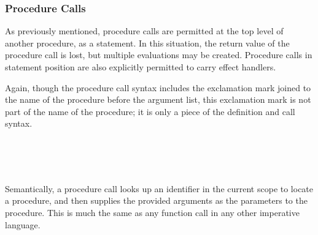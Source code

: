 \subsubsection{Procedure Calls}
\label{sec:prose-procedure-call}

As previously mentioned, procedure calls are permitted at the top level of
another procedure, as a statement. In this situation, the return value of
the procedure call is lost, but multiple evaluations may be created. Procedure
calls in statement position are also explicitly permitted to carry effect handlers.

Again, though the procedure call syntax includes the exclamation mark joined to the
name of the procedure before the argument list, this exclamation mark is not part
of the name of the procedure; it is only a piece of the definition and call syntax.

\begin{bnf*}
     \\
     \\
     \\
\end{bnf*}

Semantically, a procedure call looks up an identifier in the current scope to
locate a procedure, and then supplies the provided arguments as the parameters
to the procedure. This is much the same as any function call in any other
imperative language.

\begin{prooftree}
\end{prooftree}
